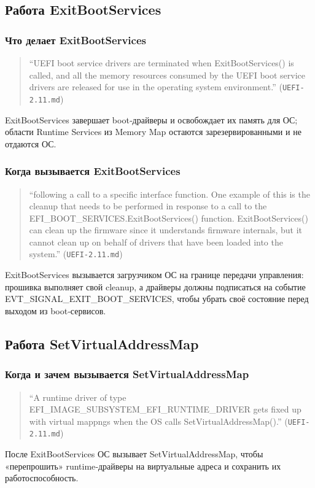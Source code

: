 \documentclass[a4paper,12pt]{article}
\begin{document}
\subsection{Работа ExitBootServices}
\subsubsection{Что делает ExitBootServices}
\begin{quote}
``UEFI boot service drivers are terminated when ExitBootServices() is called, and all the memory resources consumed by the UEFI boot service drivers are released for use in the operating system environment.'' (\texttt{UEFI-2.11.md})
\end{quote}
ExitBootServices завершает boot‑драйверы и освобождает их память для ОС; области Runtime Services из Memory Map остаются зарезервированными и не отдаются ОС.
\subsubsection{Когда вызывается ExitBootServices}
\begin{quote}
``following a call to a specific interface function. One example of this is the cleanup that needs to be performed in response to a call to the EFI\_BOOT\_SERVICES.ExitBootServices() function. ExitBootServices() can clean up the firmware since it understands firmware internals, but it cannot clean up on behalf of drivers that have been loaded into the system.'' (\texttt{UEFI-2.11.md})
\end{quote}
ExitBootServices вызывается загрузчиком ОС на границе передачи управления: прошивка выполняет свой cleanup, а драйверы должны подписаться на событие EVT\_SIGNAL\_EXIT\_BOOT\_SERVICES, чтобы убрать своё состояние перед выходом из boot‑сервисов.

\subsection{Работа SetVirtualAddressMap}
\subsubsection{Когда и зачем вызывается SetVirtualAddressMap}
\begin{quote}
``A runtime driver of type EFI\_IMAGE\_SUBSYSTEM\_EFI\_RUNTIME\_DRIVER gets fixed up with virtual mappngs when the OS calls SetVirtualAddressMap().'' (\texttt{UEFI-2.11.md})
\end{quote}
После ExitBootServices ОС вызывает SetVirtualAddressMap, чтобы «перепрошить» runtime‑драйверы на виртуальные адреса и сохранить их работоспособность.
\end{document}
